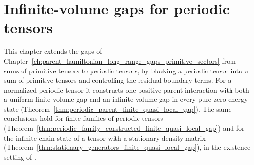 \chapter{Infinite-volume gaps for periodic tensors}
\label{ch:parent_hamiltonian_long_range_gaps_periodic}

This chapter extends the gaps of
Chapter~\ref{ch:parent_hamiltonian_long_range_gaps_primitive_sectors} from
sums of primitive tensors to periodic tensors, by blocking a periodic tensor
into a sum of primitive tensors and controlling the residual boundary terms.
For a normalized periodic tensor it constructs one positive parent interaction
with both a uniform finite-volume gap and an infinite-volume gap in every pure
zero-energy state (Theorem~\ref{thm:periodic_parent_finite_quasi_local_gap}).
The same conclusions hold for finite families of periodic tensors
(Theorem~\ref{thm:periodic_family_constructed_finite_quasi_local_gap}) and for
the infinite-chain state of a tensor with a stationary density matrix
(Theorem~\ref{thm:stationary_generators_finite_quasi_local_gap}), in the
existence setting of
\cite[Theorems~1.1--1.2]{Nachtergaele1996Spectral}.


